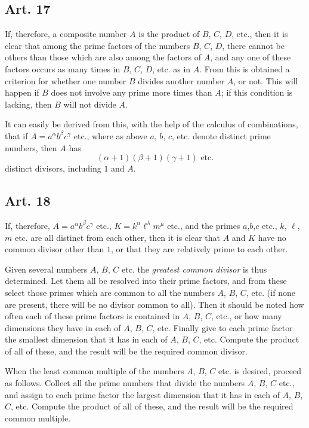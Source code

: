 \documentclass{book}
\theoremstyle{plain}
\theoremstyle{remark}
\begin{document}
\subsection*{Art. 17}

If, therefore, a composite number $A$ is the product of $B$, $C$, $D$, etc., then it is clear that among the prime factors of the numbers $B$, $C$, $D$, there cannot be others than those which are also among the factors of $A$, and any one of these factors occurs as many times in $B$, $C$, $D$, etc. as in $A$.  From this is obtained a criterion for whether one number $B$ divides another number $A$, or not.  This will happen if $B$ does not involve any prime more times than $A$; if this condition is lacking, then $B$ will not divide $A$. 

It can easily be derived from this, with the help of the calculus of combinations, that if $A = a^{\alpha} b^{\beta}c^{\gamma}$ etc., where as above $a$, $b$, $c$, etc. denote distinct prime numbers, then $A$ has
\[ (\alpha+1)(\beta+1)(\gamma+1) \textrm{ etc.} \]
distinct divisors, including $1$ and $A$.

\subsection*{Art. 18} 

If, therefore, $A = a^{\alpha}b^{\beta}c^{\gamma}$ etc., $K = k^{\alpha}\ell^{\lambda}m^{\mu}$ etc., and the primes $a$,$b$,$c$ etc., $k$, $\ell$, $m$ etc. are all distinct from each other, then it is clear that $A$ and $K$ have no common divisor other than $1$, or that they are relatively prime to each other.

Given several numbers $A$, $B$, $C$ etc. the \emph{greatest common divisor} is thus determined.  Let them all be resolved into their prime factors, and from these select those primes which are common to all the numbers $A$, $B$, $C$, etc. (if none are present, there will be no divisor common to all).  Then it should be noted how often each of these prime factors is contained in $A$, $B$, $C$, etc., or how many dimensions they have in each of $A$, $B$, $C$, etc.  Finally give to each prime factor the smallest dimension that it has in each of $A$, $B$, $C$, etc.  Compute the product of all of these, and the result will be the required common divisor.

When the least common multiple of the numbers $A$, $B$, $C$ etc. is desired, proceed as follows.  Collect all the prime numbers that divide the numbers $A$, $B$, $C$ etc., and assign to each prime factor the largest dimension that it has in each of $A$, $B$, $C$, etc.  Compute the product of all of these, and the result will be the required common multiple.
\end{document}

